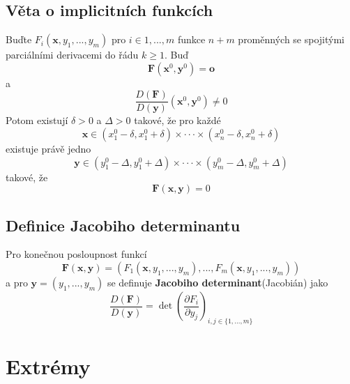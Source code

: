 \documentclass[10pt]{article}
\begin{document}

\subsection{Věta o implicitních funkcích}
\hspace{1.2mm}
\noindent
Buďte $F_i(\mathbf{x}, y_1, ... , y_m)$ pro $i \in {1, ... , m}$ funkce $n+m$ proměnných se spojitými
parciálními derivacemi do řádu $k \geq 1$. Buď \[ \mathbf{F}(\mathbf{x}^0, \mathbf{y}^0) = \mathbf{o} \]
a \[ \frac{D(\mathbf{F})}{D(\mathbf{y})}(\mathbf{x}^0, \mathbf{y}^0) \neq 0 \]
Potom existují $\delta > 0$ a $\Delta > 0$ takové, že pro každé
\[ \mathbf{x} \in (x_{1}^{0} - \delta, x_{1}^{0} + \delta) \times \cdot \cdot \cdot \times 
(x_{n}^{0} - \delta, x_{n}^{0} + \delta)\]
existuje právě jedno
\[ \mathbf{y} \in (y_{1}^{0} - \Delta , y_{1}^{0} + \Delta) \times \cdot \cdot \cdot \times
(y_{m}^{0} - \Delta , y_{m}^{0} + \Delta) \]
takové, že
\[ \mathbf{F}(\mathbf{x}, \mathbf{y}) = 0 \]

\subsection{Definice Jacobiho determinantu}
\hspace{1.2mm}
\noindent
Pro konečnou posloupnost funkcí
\[ \mathbf{F}(\mathbf{x}, \mathbf{y}) =
(F_1(\mathbf{x}, y_1, ..., y_m), ... , F_m(\mathbf{x}, y_1, ..., y_m)) \]
a pro $\mathbf{y} = (y_1, ... , y_m)$ se definuje \textbf{Jacobiho determinant}(Jacobián) jako
\[ \frac{D(\mathbf{F})}{D(\mathbf{y})} =
\det \left( \frac{\partial F_i}{\partial y_j} \right)_{i,j \in \{ 1, ... , m\}} \]

\section{Extrémy}
\hspace{1.2mm}
\noindent
\end{document}
